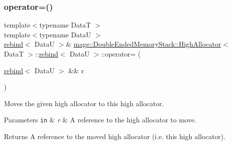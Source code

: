 \subsubsection{\texorpdfstring{operator=()}{operator=()}\hspace{0.1cm}{\footnotesize\ttfamily [2/2]}}
{\footnotesize\ttfamily template$<$typename DataT $>$ \\
template$<$typename DataU $>$ \\
\hyperlink{structmage_1_1_double_ended_memory_stack_1_1_high_allocator_1_1rebind}{rebind}$<$ DataU $>$\& \hyperlink{structmage_1_1_double_ended_memory_stack_1_1_high_allocator}{mage\+::\+Double\+Ended\+Memory\+Stack\+::\+High\+Allocator}$<$ DataT $>$\+::\hyperlink{structmage_1_1_double_ended_memory_stack_1_1_high_allocator_1_1rebind}{rebind}$<$ DataU $>$\+::operator= (\begin{DoxyParamCaption}\item[{\hyperlink{structmage_1_1_double_ended_memory_stack_1_1_high_allocator_1_1rebind}{rebind}$<$ DataU $>$ \&\&}]{r }\end{DoxyParamCaption})\hspace{0.3cm}{\ttfamily [delete]}}

Moves the given high allocator to this high allocator.


\begin{DoxyParams}[1]{Parameters}
\mbox{\tt in}  & {\em r} & A reference to the high allocator to move. \\
\hline
\end{DoxyParams}
\begin{DoxyReturn}{Returns}
A reference to the moved high allocator (i.\+e. this high allocator). 
\end{DoxyReturn}

